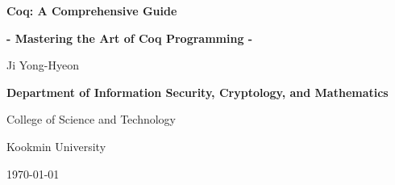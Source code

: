 \documentclass[12pt,openany]{book}
\theoremstyle{definition}
\begin{document}
	
	\begin{titlepage}
		\begin{center}
			{\Huge\textsf{\textbf{Coq: A Comprehensive Guide}}\par}
			{\Large\textsf{\textbf{- Mastering the Art of Coq Programming -}}\par}
			\vspace{0.5in}
			{\Large {Ji Yong-Hyeon}\par}
			\vspace{1in}
			\vspace{1in}
			{\large\bf \textsf{Department of Information Security, Cryptology, and Mathematics}\par}
			{\textsf{College of Science and Technology}\par}
			{\textsf{Kookmin University}\par}
			\vspace{.25in}
			{\large \textsf{\today}\par}
		\end{center}
	\end{titlepage}
	
	\frontmatter
	
%	
	
	\newpage
	\tableofcontents
	
	\newpage
	\mainmatter
%	
%	
	
	\appendix
	
%	
%	
	
	\backmatter
	
\end{document}
